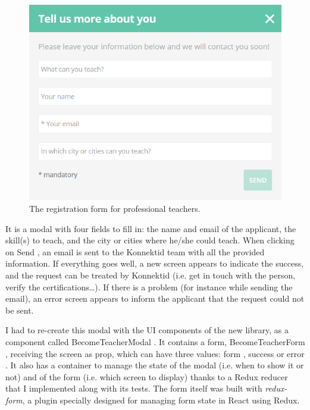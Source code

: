  \begin{figure}[H]
    \centering
    \includegraphics[scale=0.6]{figure/signUpFlow.png}
    \caption{The registration form for professional teachers.}
    \label{fig:signUpFlow}
\end{figure}

It is a modal with four fields to fill in: the name and email of the applicant, the skill(s) to teach, and the city or cities where he/she could teach. When clicking on \guillemotleft{} Send \guillemotright{}, an email is sent to the Konnektid team with all the provided information. If everything goes well, a new screen appears to indicate the success, and the request can be treated by Konnektid (i.e. get in touch with the person, verify the certifications\ldots). If there is a problem (for instance while sending the email), an error screen appears to inform the applicant that the request could not be sent.

I had to re-create this modal with the UI components of the new library, as a component called \guillemotleft{} BecomeTeacherModal \guillemotright{}. It contains a form, \guillemotleft{} BecomeTeacherForm \guillemotright{}, receiving the screen as prop, which can have three values: \guillemotleft{} form \guillemotright{}, \guillemotleft{} success \guillemotright{} or \guillemotleft{} error \guillemotright{}. It also has a container to manage the state of the modal (i.e. when to show it or not) and of the form (i.e. which screen to display) thanks to a Redux reducer that I implemented along with its tests. The form itself was built with \textit{redux-form}, a plugin specially designed for managing form state in React using Redux.


